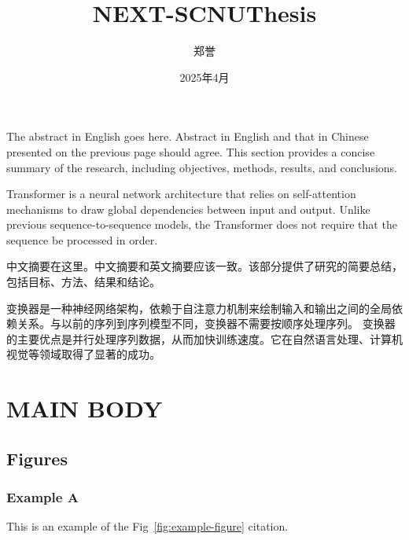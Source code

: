 \documentclass{NEXT-SCNUThesis}
\title{NEXT-SCNUThesis}
\author{郑誉}
\date{2025年4月}
\begin{document}
    \maketitle

    \begin{abstracten}
        The abstract in English goes here. Abstract in English and that in
        Chinese presented on the previous page should agree. This section provides
        a concise summary of the research, including objectives, methods,
        results, and conclusions.

        Transformer is a neural network architecture that relies on self-attention
        mechanisms to draw global dependencies between input and output. Unlike
        previous sequence-to-sequence models, the Transformer does not require that
        the sequence be processed in order.
    \end{abstracten}

    \begin{abstractzh}
        中文摘要在这里。中文摘要和英文摘要应该一致。该部分提供了研究的简要总结，包括目标、方法、结果和结论。

        变换器是一种神经网络架构，依赖于自注意力机制来绘制输入和输出之间的全局依赖关系。与以前的序列到序列模型不同，变换器不需要按顺序处理序列。
        变换器的主要优点是并行处理序列数据，从而加快训练速度。它在自然语言处理、计算机视觉等领域取得了显著的成功。
    \end{abstractzh}

    \toc

    \chapter{MAIN BODY}

    \section{Figures}
    \subsection{Example A}
    This is an example of the Fig~\ref{fig:example-figure} citation.
\end{document}
